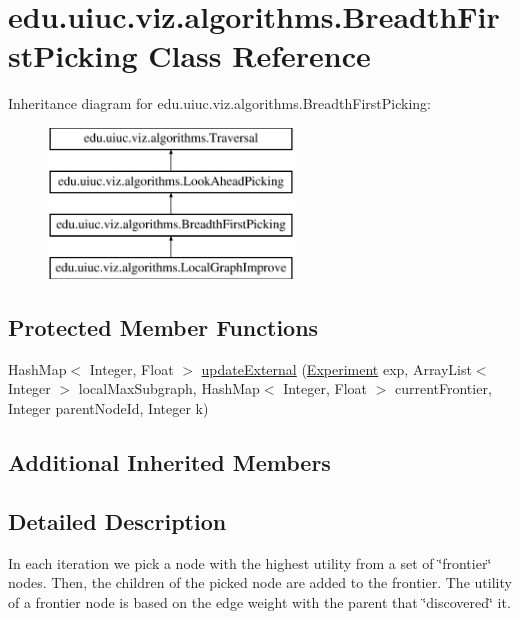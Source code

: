 \hypertarget{classedu_1_1uiuc_1_1viz_1_1algorithms_1_1_breadth_first_picking}{}\section{edu.\+uiuc.\+viz.\+algorithms.\+Breadth\+First\+Picking Class Reference}
\label{classedu_1_1uiuc_1_1viz_1_1algorithms_1_1_breadth_first_picking}
Inheritance diagram for edu.\+uiuc.\+viz.\+algorithms.\+Breadth\+First\+Picking\+:\begin{figure}[H]
\begin{center}
\leavevmode
\includegraphics[height=4.000000cm]{classedu_1_1uiuc_1_1viz_1_1algorithms_1_1_breadth_first_picking}
\end{center}
\end{figure}
\subsection*{Protected Member Functions}
\begin{DoxyCompactItemize}
\item 
Hash\+Map$<$ Integer, Float $>$ \mbox{\hyperlink{classedu_1_1uiuc_1_1viz_1_1algorithms_1_1_breadth_first_picking_ae66671d6e5c4f77f063bd1bdd7e08e89}{update\+External}} (\mbox{\hyperlink{classedu_1_1uiuc_1_1viz_1_1algorithms_1_1_experiment}{Experiment}} exp, Array\+List$<$ Integer $>$ local\+Max\+Subgraph, Hash\+Map$<$ Integer, Float $>$ current\+Frontier, Integer parent\+Node\+Id, Integer k)
\end{DoxyCompactItemize}
\subsection*{Additional Inherited Members}


\subsection{Detailed Description}
In each iteration we pick a node with the highest utility from a set of \char`\"{}frontier\char`\"{} nodes. Then, the children of the picked node are added to the frontier. The utility of a frontier node is based on the edge weight with the parent that \char`\"{}discovered\char`\"{} it.



